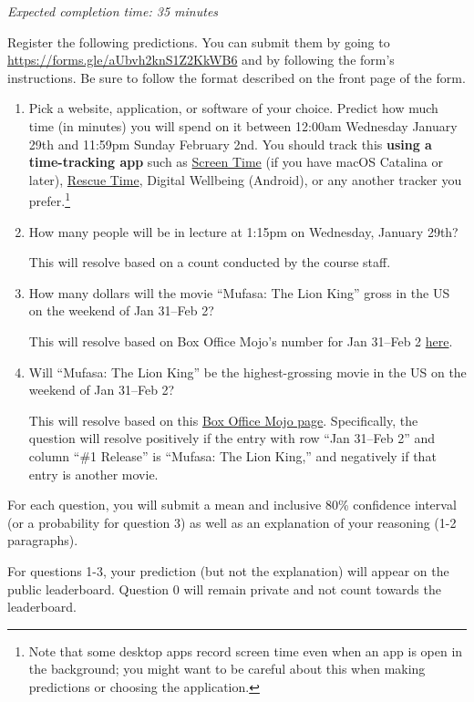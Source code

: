 \documentclass[11pt]{article}
\begin{document}
\emph{Expected completion time: 35 minutes}

Register the following predictions. You can submit them by going to 
\url{https://forms.gle/aUbvh2knS1Z2KkWB6} and by following the form's instructions. Be sure to follow the format described on the front page of the form.

\begin{enumerate}
\item[0.] Pick a website, application, or software of your choice. Predict how much time (in minutes) you will spend on it between 12:00am Wednesday January 29th and 11:59pm Sunday February 2nd. You should track this {\bf using a time-tracking app} such as \href{https://support.apple.com/en-us/HT210387}{Screen Time} (if you have macOS Catalina or later), \href{https://www.rescuetime.com/}{Rescue Time}, Digital Wellbeing (Android), or any another tracker you prefer.\footnote{Note that some desktop apps record screen time even when an app is open in the background; you might want to be careful about this when making predictions or choosing the application.}

\item[1.] How many people will be in lecture at 1:15pm on Wednesday, January 29th?

      This will resolve based on a count conducted by the course staff.

\item[2.] How many dollars will the movie ``Mufasa: The Lion King'' gross in the US on the weekend of Jan 31--Feb 2?

      This will resolve based on Box Office Mojo's number for Jan 31--Feb 2 \href{https://www.boxofficemojo.com/release/rl1511097089/weekend/?ref_=bo_rl_tab#tabs}{here}. 

\item[3.] Will ``Mufasa: The Lion King'' be the highest-grossing movie in the US on the weekend of Jan 31--Feb 2? 

      This will resolve based on this \href{https://www.boxofficemojo.com/weekend/?ref_=bo_nb_wey_secondarytab}{Box Office Mojo page}. Specifically, the question will resolve positively if the entry with row ``Jan 31--Feb 2'' and column ``\#1 Release'' is ``Mufasa: The Lion King,'' and negatively if that entry is another movie.

\end{enumerate}
 
For each question, you will submit a mean and inclusive 80\% confidence interval (or a probability for question 3) 
as well as an explanation of your reasoning (1-2 paragraphs).

For questions 1-3, your prediction (but not the explanation) will appear on the public leaderboard. 
Question 0 will remain private and not count towards the leaderboard.
\end{document}
